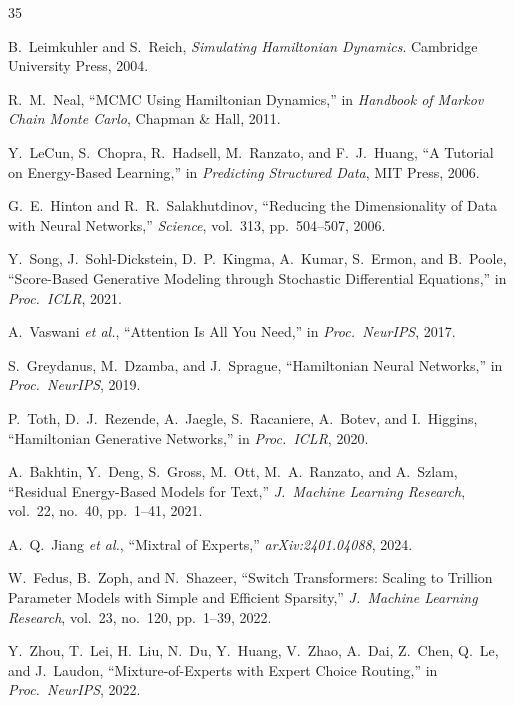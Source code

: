 \documentclass[11pt,letterpaper]{article}
\begin{document}

\begin{thebibliography}{35}

B.~Leimkuhler and S.~Reich, \emph{Simulating Hamiltonian Dynamics}. Cambridge University Press, 2004.

R.~M.~Neal, ``MCMC Using Hamiltonian Dynamics,'' in \emph{Handbook of Markov Chain Monte Carlo}, Chapman \& Hall, 2011.

Y.~LeCun, S.~Chopra, R.~Hadsell, M.~Ranzato, and F.~J.~Huang, ``A Tutorial on Energy-Based Learning,'' in \emph{Predicting Structured Data}, MIT Press, 2006.

G.~E.~Hinton and R.~R.~Salakhutdinov, ``Reducing the Dimensionality of Data with Neural Networks,'' \emph{Science}, vol.~313, pp.~504--507, 2006.

Y.~Song, J.~Sohl-Dickstein, D.~P.~Kingma, A.~Kumar, S.~Ermon, and B.~Poole, ``Score-Based Generative Modeling through Stochastic Differential Equations,'' in \emph{Proc.\ ICLR}, 2021.

A.~Vaswani \emph{et al.}, ``Attention Is All You Need,'' in \emph{Proc.\ NeurIPS}, 2017.

S.~Greydanus, M.~Dzamba, and J.~Sprague, ``Hamiltonian Neural Networks,'' in \emph{Proc.\ NeurIPS}, 2019.

P.~Toth, D.~J.~Rezende, A.~Jaegle, S.~Racaniere, A.~Botev, and I.~Higgins, ``Hamiltonian Generative Networks,'' in \emph{Proc.\ ICLR}, 2020.

A.~Bakhtin, Y.~Deng, S.~Gross, M.~Ott, M.~A.~Ranzato, and A.~Szlam, ``Residual Energy-Based Models for Text,'' \emph{J.~Machine Learning Research}, vol.~22, no.~40, pp.~1--41, 2021.

A.~Q.~Jiang \emph{et al.}, ``Mixtral of Experts,'' \emph{arXiv:2401.04088}, 2024.

W.~Fedus, B.~Zoph, and N.~Shazeer, ``Switch Transformers: Scaling to Trillion Parameter Models with Simple and Efficient Sparsity,'' \emph{J.~Machine Learning Research}, vol.~23, no.~120, pp.~1--39, 2022.

Y.~Zhou, T.~Lei, H.~Liu, N.~Du, Y.~Huang, V.~Zhao, A.~Dai, Z.~Chen, Q.~Le, and J.~Laudon, ``Mixture-of-Experts with Expert Choice Routing,'' in \emph{Proc.\ NeurIPS}, 2022.


\end{thebibliography}
\end{document}
